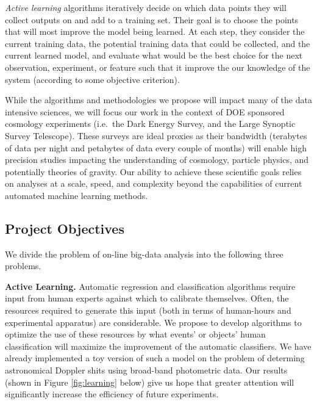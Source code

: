 \documentclass[useAMS,usenatbib,tightenlines,11pt,preprint]{aastex}
\begin{document}
{\it Active learning} algorithms iteratively decide on which data
points they will collect outputs on and add to a training set.  Their
goal is to choose the points that will most improve the model being
learned.  At each step, they consider the current training data, the
potential training data that could be collected, and the current
learned model, and evaluate what would be the best choice for the next
observation, experiment, or feature such that it improve the our
knowledge of the system (according to some objective criterion).


While the algorithms and methodologies we propose will impact many of
the data intensive sciences, we will focus our work in the context of
DOE sponsored cosmology experiments (i.e.\ the Dark Energy Survey, and
the Large Synoptic Survey Telescope). These surveys are ideal proxies
as their bandwidth (terabytes of data per night and petabytes of data
every couple of months) will enable high precision studies impacting
the understanding of cosmology, particle physics, and potentially
theories of gravity.  Our ability to achieve these scientific goals
relies on analyses at a scale, speed, and complexity beyond the
capabilities of current automated machine learning methods.

\subsection{Project Objectives}

We divide the problem of on-line big-data analysis into the following three
problems.

{\bf Active Learning.} Automatic regression and classification algorithms
require input from human experts against which to calibrate themselves.
Often, the resources required to generate this input (both in terms of
human-hours and experimental apparatus) are considerable.  We propose to develop
algorithms to optimize the use of these resources by 
what events' or objects' human classification
will maximize the improvement of the automatic classifiers.  We have already
implemented a toy version of such a model on the problem of determing
astronomical Doppler shits using broad-band photometric data.  Our results
(shown in Figure \ref{fig:learning} below) give us hope that greater attention
will significantly increase the efficiency of future experiments.
\end{document}

